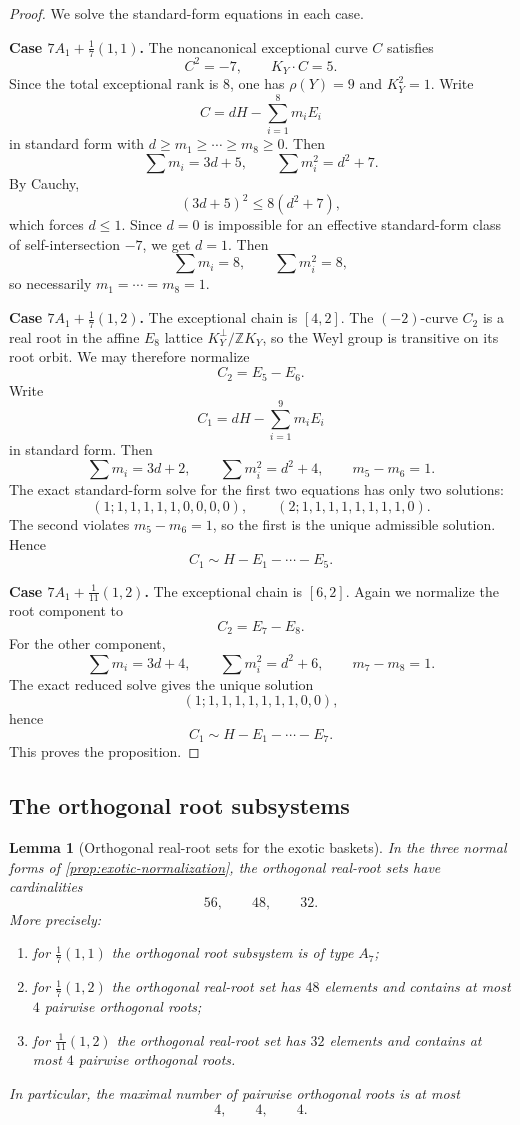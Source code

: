 \documentclass[11pt]{article}
\newtheorem{lemma}[lemma]{Lemma}
\theoremstyle{definition}
\newcommand{\Zbb}{\mathbb Z}
\begin{document}
\begin{proof}
We solve the standard-form equations in each case.

\medskip
\noindent
\textbf{Case $7A_1+\frac17(1,1)$.}
The noncanonical exceptional curve $C$ satisfies
\[
C^2=-7,\qquad K_Y\cdot C=5.
\]
Since the total exceptional rank is $8$, one has $\rho(Y)=9$ and $K_Y^2=1$. Write
\[
C=dH-\sum_{i=1}^8m_iE_i
\]
in standard form with $d\ge m_1\ge \cdots\ge m_8\ge 0$. Then
\[
\sum m_i=3d+5,\qquad \sum m_i^2=d^2+7.
\]
By Cauchy,
\[
(3d+5)^2\le 8(d^2+7),
\]
which forces $d\le 1$. Since $d=0$ is impossible for an effective standard-form class of self-intersection $-7$, we get $d=1$. Then
\[
\sum m_i=8,\qquad \sum m_i^2=8,
\]
so necessarily $m_1=\cdots=m_8=1$.

\medskip
\noindent
\textbf{Case $7A_1+\frac17(1,2)$.}
The exceptional chain is $[4,2]$. The $(-2)$-curve $C_2$ is a real root in the affine $E_8$ lattice $K_Y^{\perp}/\Zbb K_Y$, so the Weyl group is transitive on its root orbit. We may therefore normalize
\[
C_2=E_5-E_6.
\]
Write
\[
C_1=dH-\sum_{i=1}^9m_iE_i
\]
in standard form. Then
\[
\sum m_i=3d+2,\qquad \sum m_i^2=d^2+4,\qquad m_5-m_6=1.
\]
The exact standard-form solve for the first two equations has only two solutions:
\[
(1;1,1,1,1,1,0,0,0,0),\qquad (2;1,1,1,1,1,1,1,1,0).
\]
The second violates $m_5-m_6=1$, so the first is the unique admissible solution. Hence
\[
C_1\sim H-E_1-\cdots-E_5.
\]

\medskip
\noindent
\textbf{Case $7A_1+\frac1{11}(1,2)$.}
The exceptional chain is $[6,2]$. Again we normalize the root component to
\[
C_2=E_7-E_8.
\]
For the other component,
\[
\sum m_i=3d+4,\qquad \sum m_i^2=d^2+6,\qquad m_7-m_8=1.
\]
The exact reduced solve gives the unique solution
\[
(1;1,1,1,1,1,1,1,0,0),
\]
hence
\[
C_1\sim H-E_1-\cdots-E_7.
\]
This proves the proposition.
\end{proof}

\subsection{The orthogonal root subsystems}

\begin{lemma}[Orthogonal real-root sets for the exotic baskets]\label{lem:exotic-root-types}
In the three normal forms of \cref{prop:exotic-normalization}, the orthogonal real-root sets have cardinalities
\[
56,\qquad 48,\qquad 32.
\]
More precisely:
\begin{enumerate}[label=\textup{(\roman*)},leftmargin=2.5em]
    \item for $\frac17(1,1)$ the orthogonal root subsystem is of type $A_7$;
    \item for $\frac17(1,2)$ the orthogonal real-root set has $48$ elements and contains at most $4$ pairwise orthogonal roots;
    \item for $\frac1{11}(1,2)$ the orthogonal real-root set has $32$ elements and contains at most $4$ pairwise orthogonal roots.
\end{enumerate}
In particular, the maximal number of pairwise orthogonal roots is at most
\[
4,\qquad 4,\qquad 4.
\]
\end{lemma}
\end{document}
